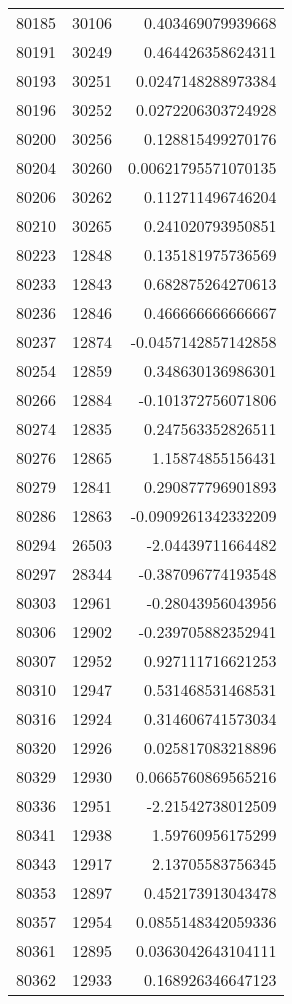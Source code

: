 \begin{tabular}{r | r | r}
80185 & 30106 & 0.403469079939668 \\
80191 & 30249 & 0.464426358624311 \\
80193 & 30251 & 0.0247148288973384 \\
80196 & 30252 & 0.0272206303724928 \\
80200 & 30256 & 0.128815499270176 \\
80204 & 30260 & 0.00621795571070135 \\
80206 & 30262 & 0.112711496746204 \\
80210 & 30265 & 0.241020793950851 \\
80223 & 12848 & 0.135181975736569 \\
80233 & 12843 & 0.682875264270613 \\
80236 & 12846 & 0.466666666666667 \\
80237 & 12874 & -0.0457142857142858 \\
80254 & 12859 & 0.348630136986301 \\
80266 & 12884 & -0.101372756071806 \\
80274 & 12835 & 0.247563352826511 \\
80276 & 12865 & 1.15874855156431 \\
80279 & 12841 & 0.290877796901893 \\
80286 & 12863 & -0.0909261342332209 \\
80294 & 26503 & -2.04439711664482 \\
80297 & 28344 & -0.387096774193548 \\
80303 & 12961 & -0.28043956043956 \\
80306 & 12902 & -0.239705882352941 \\
80307 & 12952 & 0.927111716621253 \\
80310 & 12947 & 0.531468531468531 \\
80316 & 12924 & 0.314606741573034 \\
80320 & 12926 & 0.025817083218896 \\
80329 & 12930 & 0.0665760869565216 \\
80336 & 12951 & -2.21542738012509 \\
80341 & 12938 & 1.59760956175299 \\
80343 & 12917 & 2.13705583756345 \\
80353 & 12897 & 0.452173913043478 \\
80357 & 12954 & 0.0855148342059336 \\
80361 & 12895 & 0.0363042643104111 \\
80362 & 12933 & 0.168926346647123 \\

\end{tabular}
